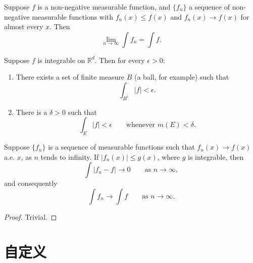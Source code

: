 \begin{corollary}
    Suppose $f$ is a non-negative measurable function, and $\{f_n\}$ a sequence
    of non-negative measurable functions with
    $f_n(x) \leq f(x)$ and $f_n(x) \to f(x)$ for almost every $x$. Then
    \begin{equation}
        \lim_{n \to \infty} \int f_n = \int f.
    \end{equation}
\end{corollary}

\begin{proposition}
    Suppose $f$ is integrable on $\mathbb{R}^d$. Then for every $\epsilon > 0$:
    \begin{enumerate}
        \renewcommand{\theenumi}{\roman{enumi}}
        \item There exists a set of finite measure $B$ (a ball, for example) such that
        \begin{equation}
            \int_{B^c} |f| < \epsilon.
        \end{equation}
        \item There is a $\delta > 0$ such that
        \begin{equation}
            \int_E |f| < \epsilon \qquad \text{whenever } m(E) < \delta.
        \end{equation}
    \end{enumerate}
\end{proposition}

\begin{theorem}
    Suppose $\{f_n\}$ is a sequence of measurable functions such that
    $f_n(x) \to f(x)$ a.e. $x$, as $n$ tends to infinity.
    If $|f_n(x)| \leq g(x)$, where $g$ is integrable, then
    \begin{equation}
        \int |f_n - f| \to 0 \qquad \text{as } n \to \infty,
    \end{equation}
    and consequently
    \begin{equation}
        \int f_n \to \int f \qquad \text{as } n \to \infty.
    \end{equation}
\end{theorem}

\begin{proof}
    Trivial.
\end{proof}



\section{自定义}

